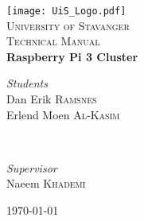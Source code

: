\begin{titlepage} %
	\newcommand{\HRule}{\rule{\linewidth}{0.5mm}} %
	
	\center %
	
	
	\vfill
	\texttt{[image: UiS\_Logo.pdf]}\\[1cm] %
	\textsc{\LARGE University of Stavanger}\\[1.5cm] %
	
	
	\textsc{\Large Technical Manual}\\[1.5cm] %
	
	
	{\huge\bfseries Raspberry Pi 3 Cluster}\\[3.0cm]
	
	
	\begin{minipage}{0.4\textwidth}
		\begin{flushleft}
			\large
			\textit{Students}\\
			Dan Erik \textsc{Ramsnes}\\
			Erlend Moen \textsc{Al-Kasim}
		\end{flushleft}
	\end{minipage}
	~
	\begin{minipage}{0.4\textwidth}
		\begin{flushright}
			\large
			\textit{Supervisor}\\
			Naeem \textsc{Khademi}\\
			\phantom{1pt}
		\end{flushright}
	\end{minipage}
	
	
	\vfill\vfill\vfill %
	{\large\today} %
	\vfill %
	
\end{titlepage}